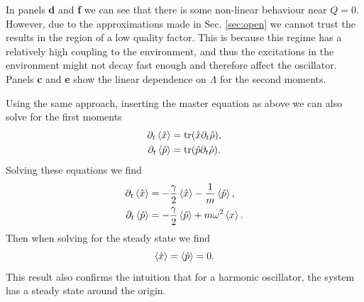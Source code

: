 In panels \textbf{d} and \textbf{f} we can see that there is some non-linear behaviour near $Q = 0$. However, due to the approximations made in Sec. \ref{sec:open} we cannot trust the results in the region of a low quality factor. This is because this regime has a relatively high coupling to the environment, and thus the excitations in the environment might not decay fast enough and therefore affect the oscillator. Panels \textbf{c} and \textbf{e} show the linear dependence on $\Lambda$ for the second moments.

Using the same approach, inserting the master equation as above we can also solve for the first moments
\begin{align}
    \partial_t\expval{\hat{x}} &= \tr(\hat{x} \partial_t \hat{\rho}),\\
    \partial_t\expval{\hat{p}} &= \tr(\hat{p} \partial_t \hat{\rho}).
\end{align}
Solving these equations we find 
\begin{align}
    \partial_t\expval{\hat{x}} &= -\frac{\gamma}{2} \expval{\hat{x}} - \frac{1}{m} \expval{\hat{p}},\\
    \partial_t\expval{\hat{p}} &= -\frac{\gamma}{2} \expval{\hat{p}} + m\omega^2 \expval{x}.
\end{align}
Then when solving for the steady state we find 
\begin{equation}
    \expval{\hat{x}} = \expval{\hat{p}} = 0. \label{eq:xp0}
\end{equation}
This result also confirms the intuition that for a harmonic oscillator, the system has a steady state around the origin. 

